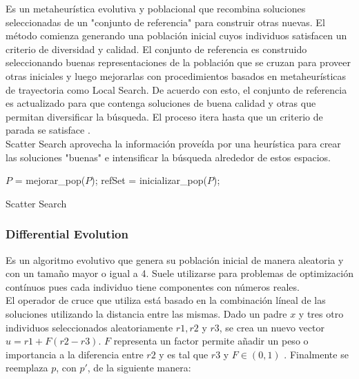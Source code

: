 \documentclass{ci5652}
\begin{document}
Es un metaheurística evolutiva y poblacional que recombina soluciones 
seleccionadas de un "conjunto de referencia" para construir otras nuevas. El
método comienza generando una población inicial cuyos individuos satisfacen un
criterio de diversidad y calidad. El conjunto de referencia es construido
seleccionando buenas representaciones de la población que se cruzan para proveer
otras iniciales y luego mejorarlas con procedimientos basados en metaheurísticas
de trayectoria como Local Search. De acuerdo con esto, el conjunto de referencia
es actualizado para que contenga soluciones de buena calidad y otras que
permitan diversificar la búsqueda. El proceso itera hasta que un criterio de
parada se satisface \cite{Talbi_2009}.\\ 

Scatter Search aprovecha la información proveída por una heurística para crear
las soluciones "buenas" e intensificar la búsqueda alrededor de estos espacios. 

\begin{algorithm}
 \DontPrintSemicolon
 \vspace*{0.1cm}
  $P$ = mejorar\_pop($P$);\;
  refSet = inicializar\_pop($P$);\;
 \vspace*{0.1cm}
 \caption{Scatter Search}
\end{algorithm}


\subsubsection{Differential Evolution}

Es un algoritmo evolutivo que genera su población inicial de manera aleatoria y
con un tamaño mayor o igual a 4. Suele utilizarse para problemas de optimización
contínuos pues cada individuo tiene componentes con números reales.\\ 

El operador de cruce que utiliza está basado en la combinación líneal de las
soluciones utilizando la distancia entre las mismas. Dado un padre $x$ y tres
otro individuos seleccionados aleatoriamente $r1, r2$ y $r3$, se crea un nuevo
vector $u = r1 + F(r2 - r3)$. $F$ representa un factor permite añadir un peso o
importancia a la diferencia entre $r2$ y es tal que $r3$ y $F \in (0, 1)$
\cite{Glover_2003}. Finalmente se reemplaza $p$, con $p'$, de la
siguiente manera: 
\end{document}
